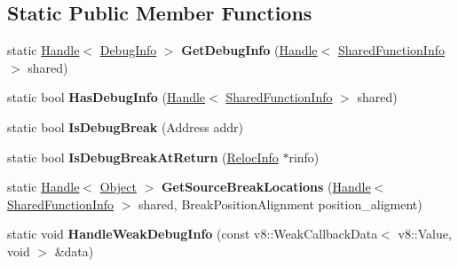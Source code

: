 \subsection*{Static Public Member Functions}
\begin{DoxyCompactItemize}
\item 
\hypertarget{classv8_1_1internal_1_1_debug_a732834d10097d43e4749831ee72abff4}{}static \hyperlink{classv8_1_1internal_1_1_handle}{Handle}$<$ \hyperlink{classv8_1_1internal_1_1_debug_info}{Debug\+Info} $>$ {\bfseries Get\+Debug\+Info} (\hyperlink{classv8_1_1internal_1_1_handle}{Handle}$<$ \hyperlink{classv8_1_1internal_1_1_shared_function_info}{Shared\+Function\+Info} $>$ shared)\label{classv8_1_1internal_1_1_debug_a732834d10097d43e4749831ee72abff4}

\item 
\hypertarget{classv8_1_1internal_1_1_debug_a020ad271aa9e8144b3bdcd22e9be236d}{}static bool {\bfseries Has\+Debug\+Info} (\hyperlink{classv8_1_1internal_1_1_handle}{Handle}$<$ \hyperlink{classv8_1_1internal_1_1_shared_function_info}{Shared\+Function\+Info} $>$ shared)\label{classv8_1_1internal_1_1_debug_a020ad271aa9e8144b3bdcd22e9be236d}

\item 
\hypertarget{classv8_1_1internal_1_1_debug_af46bd8efb2250aa9f1ba5013e689b78b}{}static bool {\bfseries Is\+Debug\+Break} (Address addr)\label{classv8_1_1internal_1_1_debug_af46bd8efb2250aa9f1ba5013e689b78b}

\item 
\hypertarget{classv8_1_1internal_1_1_debug_a7401b26b7e285f4cd10bec4f360a5ac0}{}static bool {\bfseries Is\+Debug\+Break\+At\+Return} (\hyperlink{classv8_1_1internal_1_1_reloc_info}{Reloc\+Info} $\ast$rinfo)\label{classv8_1_1internal_1_1_debug_a7401b26b7e285f4cd10bec4f360a5ac0}

\item 
\hypertarget{classv8_1_1internal_1_1_debug_a8f37369d2f082eee77b87b25df95c037}{}static \hyperlink{classv8_1_1internal_1_1_handle}{Handle}$<$ \hyperlink{classv8_1_1internal_1_1_object}{Object} $>$ {\bfseries Get\+Source\+Break\+Locations} (\hyperlink{classv8_1_1internal_1_1_handle}{Handle}$<$ \hyperlink{classv8_1_1internal_1_1_shared_function_info}{Shared\+Function\+Info} $>$ shared, Break\+Position\+Alignment position\+\_\+aligment)\label{classv8_1_1internal_1_1_debug_a8f37369d2f082eee77b87b25df95c037}

\item 
\hypertarget{classv8_1_1internal_1_1_debug_a17d3d442e6bd2778edd5db9afbf19f8e}{}static void {\bfseries Handle\+Weak\+Debug\+Info} (const v8\+::\+Weak\+Callback\+Data$<$ v8\+::\+Value, void $>$ \&data)\label{classv8_1_1internal_1_1_debug_a17d3d442e6bd2778edd5db9afbf19f8e}


\end{DoxyCompactItemize}
